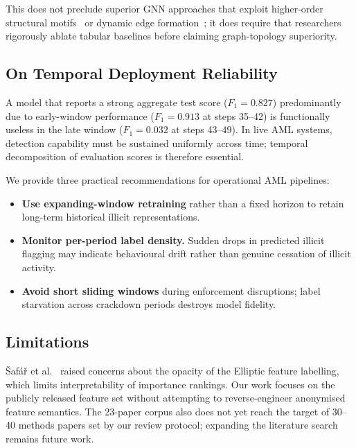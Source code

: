 \documentclass[conference]{IEEEtran}
\begin{document}
This does not preclude superior GNN approaches that exploit higher-order
structural motifs~\cite{bellei2024shape} or dynamic edge
formation~\cite{han2026featuregated}; it does require that researchers
rigorously ablate tabular baselines before claiming graph-topology
superiority.

\subsection{On Temporal Deployment Reliability}

A model that reports a strong aggregate test score ($F_1 = 0.827$)
predominantly due to early-window performance ($F_1 = 0.913$ at steps 35--42)
is functionally useless in the late window ($F_1 = 0.032$ at steps 43--49).
In live AML systems, detection capability must be sustained uniformly across
time; temporal decomposition of evaluation scores is therefore essential.

We provide three practical recommendations for operational AML pipelines:
\begin{itemize}
  \item \textbf{Use expanding-window retraining} rather than a fixed horizon
    to retain long-term historical illicit representations.
  \item \textbf{Monitor per-period label density.} Sudden drops in predicted
    illicit flagging may indicate behavioural drift rather than genuine
    cessation of illicit activity.
  \item \textbf{Avoid short sliding windows} during enforcement disruptions;
    label starvation across crackdown periods destroys model fidelity.
\end{itemize}

\subsection{Limitations}

{\v{S}}af{\'{a}}{\v{r}} et al.~\cite{safar2026enemy} raised concerns about
the opacity of the Elliptic feature labelling, which limits interpretability
of importance rankings.
Our work focuses on the publicly released feature set without attempting to
reverse-engineer anonymised feature semantics.
The 23-paper corpus also does not yet reach the target of 30--40 methods
papers set by our review protocol; expanding the literature search remains
future work.

\end{document}
